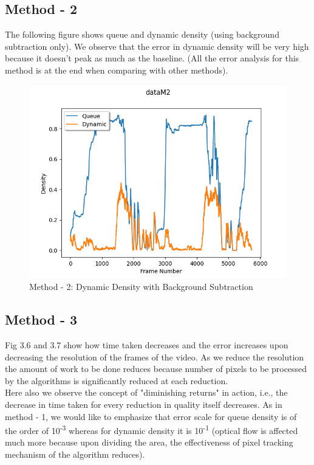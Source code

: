 \documentclass[paper=a4, fontsize = 12pt]{scrartcl}
\numberwithin{equation}{section}		%
\numberwithin{figure}{section}			%
\numberwithin{table}{section}				%
\begin{document}
\subsection{Method - 2}

The following figure shows queue and dynamic density (using background subtraction only). We observe that the error in dynamic density will be very high because it doesn't peak as much as the baseline. (All the error analysis for this method is at the end when comparing with other methods).

\begin{figure}[H]
    \centering
    \captionsetup{justification=centering,margin=2cm}
    \includegraphics[width = 15cm]{dataM2.png}
    \caption{Method - 2: Dynamic Density with Background Subtraction}
    \label{fig:M2DynamicBS}
\end{figure}

\subsection{Method - 3}

Fig 3.6 and 3.7 show how time taken decreases and the error increases upon decreasing the resolution of the frames of the video. As we reduce the resolution the amount of work to be done reduces because number of pixels to be processed by the algorithms is significantly reduced at each reduction. \\
Here also we observe the concept of "diminishing returns" in action, i.e., the decrease in time taken for every reduction in quality itself decreases. As in method - 1, we would like to emphasize that error scale for queue density is of the order of 10\textsuperscript{-3} whereas for dynamic density it is 10\textsuperscript{-1} (optical flow is affected much more because upon dividing the area, the effectiveness of pixel tracking mechanism of the algorithm reduces).
\end{document}
